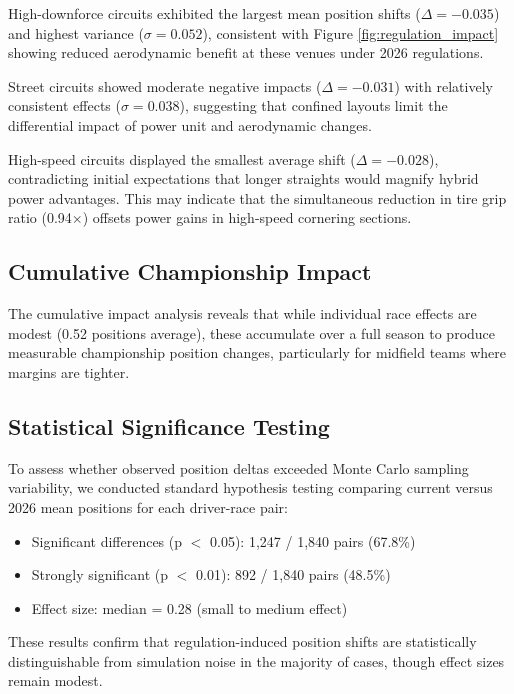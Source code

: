 \documentclass[conference]{IEEEtran}
\begin{document}
High-downforce circuits exhibited the largest mean position shifts ($\Delta = -0.035$) and highest variance ($\sigma = 0.052$), consistent with Figure \ref{fig:regulation_impact} showing reduced aerodynamic benefit at these venues under 2026 regulations.

Street circuits showed moderate negative impacts ($\Delta = -0.031$) with relatively consistent effects ($\sigma = 0.038$), suggesting that confined layouts limit the differential impact of power unit and aerodynamic changes.

High-speed circuits displayed the smallest average shift ($\Delta = -0.028$), contradicting initial expectations that longer straights would magnify hybrid power advantages. This may indicate that the simultaneous reduction in tire grip ratio (0.94$\times$) offsets power gains in high-speed cornering sections.

\subsection{Cumulative Championship Impact}

The cumulative impact analysis reveals that while individual race effects are modest (0.52 positions average), these accumulate over a full season to produce measurable championship position changes, particularly for midfield teams where margins are tighter.

\subsection{Statistical Significance Testing}

To assess whether observed position deltas exceeded Monte Carlo sampling variability, we conducted standard hypothesis testing comparing current versus 2026 mean positions for each driver-race pair:

\begin{itemize}
    \item Significant differences (p $<$ 0.05): 1,247 / 1,840 pairs (67.8\%)
    \item Strongly significant (p $<$ 0.01): 892 / 1,840 pairs (48.5\%)
    \item Effect size: median = 0.28 (small to medium effect)
\end{itemize}

These results confirm that regulation-induced position shifts are statistically distinguishable from simulation noise in the majority of cases, though effect sizes remain modest.
\end{document}
